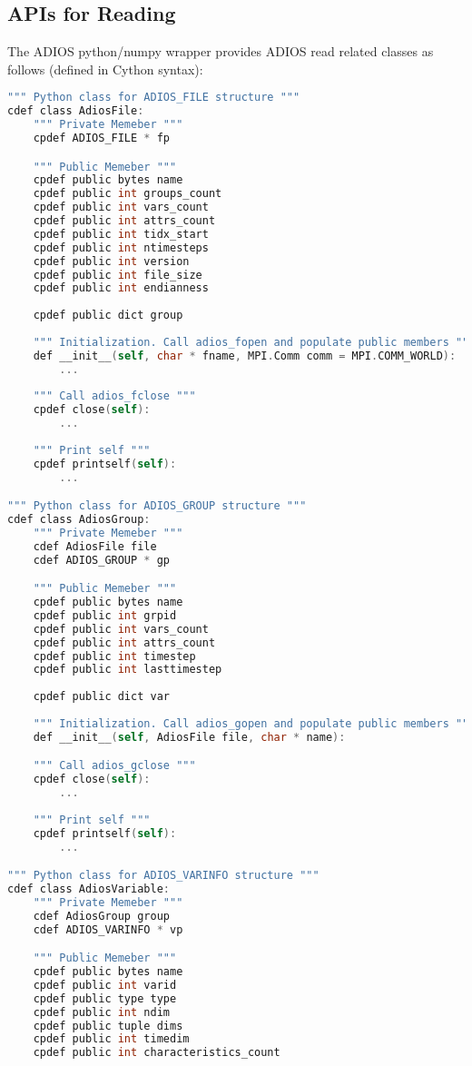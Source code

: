 \subsection{APIs for Reading}
The ADIOS python/numpy wrapper provides ADIOS read related classes as follows (defined in Cython syntax):
\begin{lstlisting}[language=C,frame=single, backgroundcolor=\color{gray85},caption={Write functions},label={},]
""" Python class for ADIOS_FILE structure """
cdef class AdiosFile:
    """ Private Memeber """
    cpdef ADIOS_FILE * fp

    """ Public Memeber """
    cpdef public bytes name
    cpdef public int groups_count
    cpdef public int vars_count
    cpdef public int attrs_count
    cpdef public int tidx_start
    cpdef public int ntimesteps
    cpdef public int version
    cpdef public int file_size
    cpdef public int endianness
    
    cpdef public dict group
    
    """ Initialization. Call adios_fopen and populate public members """
    def __init__(self, char * fname, MPI.Comm comm = MPI.COMM_WORLD):
        ...
    
    """ Call adios_fclose """
    cpdef close(self):
        ...
        
    """ Print self """
    cpdef printself(self):
        ...

""" Python class for ADIOS_GROUP structure """
cdef class AdiosGroup:
    """ Private Memeber """
    cdef AdiosFile file
    cdef ADIOS_GROUP * gp

    """ Public Memeber """
    cpdef public bytes name
    cpdef public int grpid
    cpdef public int vars_count
    cpdef public int attrs_count
    cpdef public int timestep
    cpdef public int lasttimestep
    
    cpdef public dict var
    
    """ Initialization. Call adios_gopen and populate public members """
    def __init__(self, AdiosFile file, char * name):

    """ Call adios_gclose """
    cpdef close(self):
        ...
        
    """ Print self """
    cpdef printself(self):
        ...

""" Python class for ADIOS_VARINFO structure """
cdef class AdiosVariable:
    """ Private Memeber """
    cdef AdiosGroup group
    cdef ADIOS_VARINFO * vp

    """ Public Memeber """
    cpdef public bytes name
    cpdef public int varid
    cpdef public type type
    cpdef public int ndim
    cpdef public tuple dims
    cpdef public int timedim
    cpdef public int characteristics_count
    

\end{lstlisting}
